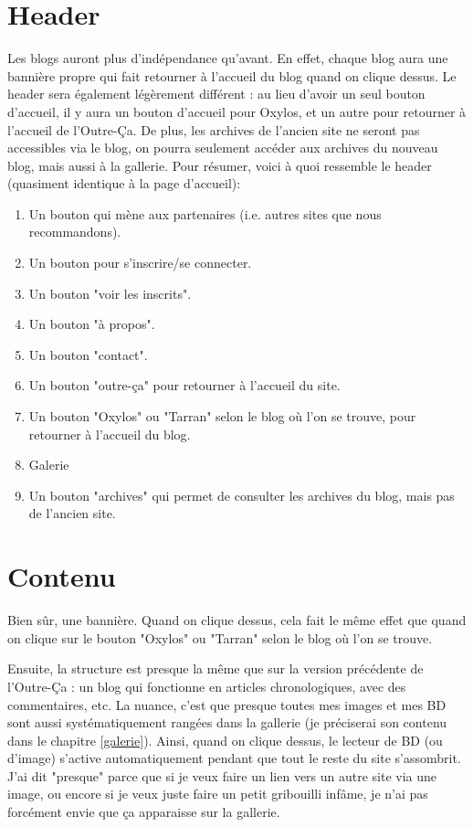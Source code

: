 \documentclass[french]{report}
\theoremstyle{plain}
\begin{document}
		\section{Header}
			Les blogs auront plus d'indépendance qu'avant. En effet, chaque blog aura une bannière propre qui fait retourner à l'accueil du blog quand on clique dessus. Le header sera également légèrement différent : au lieu d'avoir un seul bouton d'accueil, il y aura un bouton d'accueil pour Oxylos, et un autre pour retourner à l'accueil de l'Outre-Ça. De plus, les archives de l'ancien site ne seront pas accessibles via le blog, on pourra seulement accéder aux archives du nouveau blog, mais aussi à la gallerie. Pour résumer, voici à quoi ressemble le header (quasiment identique à la page d'accueil):
			\begin{enumerate}
				\item Un bouton qui mène aux partenaires (i.e. autres sites que nous recommandons).
				\item Un bouton pour s'inscrire/se connecter.
				\item Un bouton "voir les inscrits".				
				\item Un bouton "à propos".
				\item Un bouton "contact".
				\item Un bouton "outre-ça" pour retourner à l'accueil du site.
				\item Un bouton "Oxylos" ou "Tarran" selon le blog où l'on se trouve, pour retourner à l'accueil du blog.
				\item Galerie
				\item Un bouton "archives" qui permet de consulter les archives du blog, mais pas de l'ancien site.
			\end{enumerate}

		\section{Contenu}
			Bien sûr, une bannière. Quand on clique dessus, cela fait le même effet que quand on clique sur le bouton "Oxylos" ou "Tarran" selon le blog où l'on se trouve.

			Ensuite, la structure est presque la même que sur la version précédente de l'Outre-Ça : un blog qui fonctionne en articles chronologiques, avec des commentaires, etc. La nuance, c'est que presque toutes mes images et mes BD sont aussi systématiquement rangées dans la gallerie (je préciserai son contenu dans le chapitre \ref{galerie}). Ainsi, quand on clique dessus, le lecteur de BD (ou d'image) s'active automatiquement pendant que tout le reste du site s'assombrit. J'ai dit "presque" parce que si je veux faire un lien vers un autre site via une image, ou encore si je veux juste faire un petit gribouilli infâme, je n'ai pas forcément envie que ça apparaisse sur la gallerie.
\end{document}
